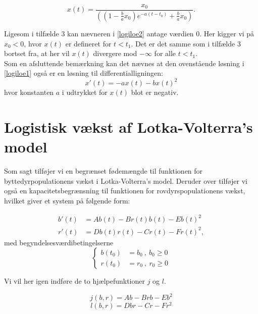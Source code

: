 \begin{equation}\label{logiloe2}
    x(t)= \frac{x_0}{ \left( \left(1- \frac{b}{a}x_0 \right)e^{-a(t-t_0)}+ \frac{b}{a}x_0 \right)}.
\end{equation}

Ligesom i tilfælde 3 kan nævneren i \eqref{logiloe2} antage værdien $0$. Her kigger vi på $x_0<0$, hvor $x(t)$ er defineret for $t<t_1$. Det er det samme som i tilfælde 3 bortset fra, at her vil $x(t)$ divergere mod $-\infty$ for alle $t<t_1$. 
\\ \hfill \break
Som en afsluttende bemærkning kan det nævnes at den ovenstående løsning i \ref{logiloe1} også er en løsning til differentialligningen:
\begin{equation}
    x'(t)=-ax(t)-bx(t)^2
\end{equation}
hvor konstanten $a$ i udtrykket for $x(t)$ blot er negativ. 
\section{Logistisk vækst af Lotka-Volterra's model}\label{lovaelovo}

Som sagt tilføjer vi en begrænset fødemængde til funktionen for byttedyrpopulationens vækst i Lotka-Volterra's model. Deruder over tilføjer vi også en kapacitetsbegrænsning til funktionen for rovdyrspopulationens vækst, hvilket giver et system på følgende form:

\begin{equation}\label{lovaeIVP}
\begin{aligned}
    b'(t) &=Ab(t)-Br(t)b(t)-Eb(t)^2\\
    r'(t) &=Db(t)r(t)-Cr(t)-Fr(t)^2,
\end{aligned}   
\end{equation}
med begyndelsesværdibetingelserne
\begin{equation}\label{IVPLovae}
    \begin{cases}
    b(t_0)&=b_0 \ , \ b_0\geq 0\\
    r(t_0)&=r_0 \ , \ r_0\geq 0
    \end{cases}
\end{equation}

Vi vil her igen indføre de to hjælpefunktioner $j$ og $l$.

\begin{equation}\label{hf1}
    j(b,r)=Ab-Brb-Eb^2
\end{equation}
\begin{equation}\label{hf2}
    l(b,r)=Dbr-Cr-Fr^2
\end{equation}
\hfill \break

